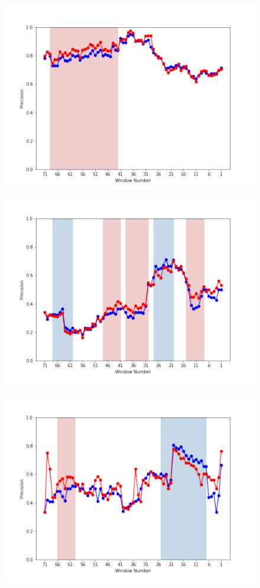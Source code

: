 \documentclass[submit]{ipsj}
\begin{document}
\begin{figure}[t]
\begin{minipage}[b]{0.65\columnwidth}
    \includegraphics[width=1\columnwidth]{Uenaka_fig/RQ2_result/Cinder/Cinder_review_Precision.pdf}
    \includegraphics[width=1\columnwidth]{Uenaka_fig/RQ2_result/Keystone/Keystone_review_Precision.pdf}
\end{minipage}
\begin{minipage}[b]{0.65\columnwidth}
    \centering
    \includegraphics[width=1\columnwidth]{Uenaka_fig/RQ2_result/Swift/Swift_review_Precision.pdf}

\end{minipage}
\end{figure}
\end{document}
